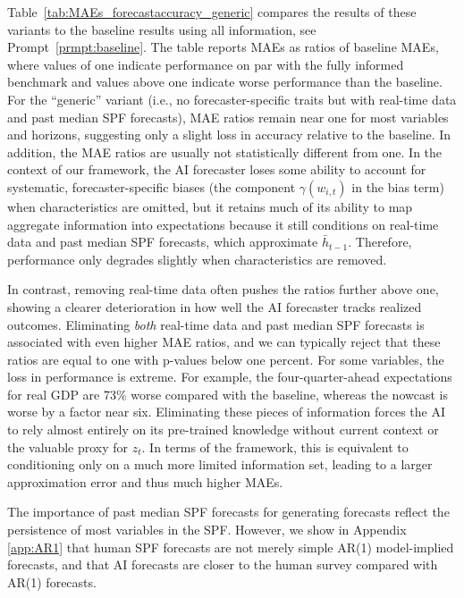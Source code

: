 \documentclass[11pt,letterpaper]{scrartcl}
\begin{document}
Table~\ref{tab:MAEs_forecastaccuracy_generic} compares the results of these variants to the baseline results using all information, see Prompt~\ref{prmpt:baseline}. The table reports MAEs as ratios of baseline MAEs, where values of one indicate performance on par with the fully informed benchmark and values above one indicate worse performance than the baseline. For the ``generic'' variant (i.e., no forecaster-specific traits but with real-time data and past median SPF forecasts), MAE ratios remain near one for most variables and horizons, suggesting only a slight loss in accuracy relative to the baseline. In addition, the MAE ratios are usually not statistically different from one. In the context of our framework, the AI forecaster loses some ability to account for systematic, forecaster-specific biases (the component \(\gamma(w_{i,t})\) in the bias term) when characteristics are omitted, but it retains much of its ability to map aggregate information into expectations because it still conditions on real-time data and past median SPF forecasts, which approximate \(\bar{h}_{t-1}\). Therefore, performance only degrades slightly when characteristics are removed.

In contrast, removing real-time data often pushes the ratios further above one, showing a clearer deterioration in how well the AI forecaster tracks realized outcomes. Eliminating \emph{both} real-time data and past median SPF forecasts is associated with even higher MAE ratios, and we can typically reject that these ratios are equal to one with p-values below one percent. For some variables, the loss in performance is extreme. For example, the four-quarter-ahead expectations for real GDP are 73\% worse compared with the baseline, whereas the nowcast is worse by a factor near six. Eliminating these pieces of information forces the AI to rely almost entirely on its pre-trained knowledge without current context or the valuable proxy for \(z_t\). In terms of the framework, this is equivalent to conditioning only on a much more limited information set, leading to a larger approximation error and thus much higher MAEs.

The importance of past median SPF forecasts for generating forecasts reflect the persistence of most variables in the SPF. However, we show in Appendix \ref{app:AR1} that human SPF forecasts are not merely simple AR(1) model-implied forecasts, and that AI forecasts are closer to the human survey compared with AR(1) forecasts. 
\end{document}
